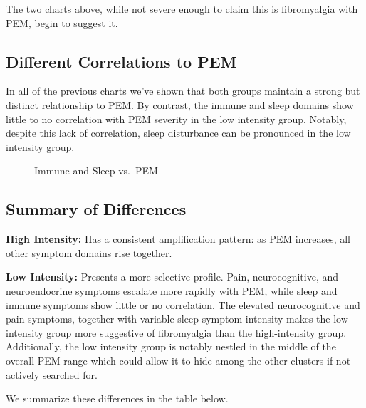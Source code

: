 \documentclass[
  letterpaper,
  DIV=11,
  numbers=noendperiod]{scrartcl}
\begin{document}
\FloatBarrier

The two charts above, while not severe enough to claim this is
fibromyalgia with PEM, begin to suggest it.

\subsection{Different Correlations to
PEM}\label{different-correlations-to-pem}

In all of the previous charts we've shown that both groups maintain a
strong but distinct relationship to PEM. By contrast, the immune and
sleep domains show little to no correlation with PEM severity in the low
intensity group. Notably, despite this lack of correlation, sleep
disturbance can be pronounced in the low intensity group.

\begin{figure}[h]


\caption{\label{fig-distinct}Immune and Sleep vs.~PEM}

\end{figure}%

\FloatBarrier

\subsection{Summary of Differences}\label{summary-of-differences}

\textbf{High Intensity:} Has a consistent amplification pattern: as PEM
increases, all other symptom domains rise together.

\textbf{Low Intensity:} Presents a more selective profile. Pain,
neurocognitive, and neuroendocrine symptoms escalate more rapidly with
PEM, while sleep and immune symptoms show little or no correlation. The
elevated neurocognitive and pain symptoms, together with variable sleep
symptom intensity makes the low-intensity group more suggestive of
fibromyalgia than the high-intensity group. Additionally, the low
intensity group is notably nestled in the middle of the overall PEM
range which could allow it to hide among the other clusters if not
actively searched for.

We summarize these differences in the table below.\bigskip
\end{document}

